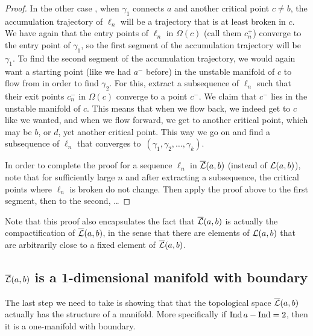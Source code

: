 \begin{proof}
    In the other case , when $\gamma_1$ connects $a$ and another critical point $c \neq b$, the accumulation trajectory of $\ell_n$ will be a trajectory that is at least broken in $c$.
We have again that the entry points of $\ell_n$ in $\Omega(c)$ (call them $c_n^{+}$) converge to the entry point of $\gamma_1$, so the first segment of the accumulation trajectory will be $\gamma_1$.
To find the second segment of the accumulation trajectory, we would again want a starting point (like we had $a^{-}$ before) in the unstable manifold of $c$ to flow from in order to find $\gamma_{2}$.
For this, extract a subsequence of $\ell_n$ such that their exit points $c^{-}_n$ in $\Omega(c)$ converge to a point $c^{-}$.
We claim that $c^{-}$ lies in the unstable manifold of $c$.
This means that when we flow back, we indeed get to $c$ like we wanted, and when we flow forward, we get to another critical point, which may be $b$, or $d$, yet another critical point. This way we go on and find a subsequence of $\ell_n$ that converges to~$(\gamma_1, \gamma_2, \ldots, \gamma_k)$.

In order to complete the proof for a sequence $\ell_n$ in $ \overline{\mathcal L}(a, b)$ (instead of $\mathcal L(a, b)$), note that for sufficiently large $n$ and after extracting a subsequence, the critical points where $ \ell_n$ is broken do not change. Then apply the proof above to the first segment, then to the second, \ldots
\end{proof}

Note that this proof also encapsulates the fact that $\overline{\mathcal L}(a, b)$ is actually the compactification of  $\overline{\mathcal L}(a, b)$, in the sense that there are elements of  $\mathcal L(a, b)$ that are arbitrarily close to a fixed element of $\overline{\mathcal L}(a, b)$.


\subsection{$\overline{\mathcal L}(a, b)$ is a 1-dimensional manifold with boundary}

The last step we need to take is showing that that the topological space $\overline{\mathcal L}(a, b)$ actually has the structure of a manifold.
More specifically if $\operatorname{Ind} a - \operatorname{Ind} = 2$, then it is a one-manifold with boundary.

